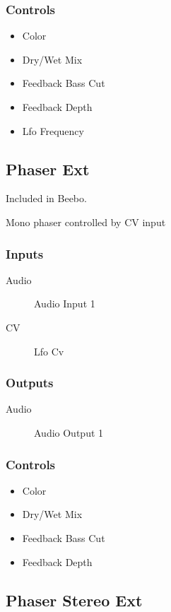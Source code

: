 \subsubsection{Controls}
\begin{itemize}
\item Color
\item Dry/Wet Mix
\item Feedback Bass Cut
\item Feedback Depth
\item Lfo Frequency
\end{itemize}

\subsection{Phaser Ext}

Included in Beebo.

Mono phaser controlled by CV input



\subsubsection{Inputs}
\begin{description}
\item [Audio] Audio Input 1
\item [CV] Lfo Cv
\end{description}

\subsubsection{Outputs}
\begin{description}
\item [Audio] Audio Output 1
\end{description}

\subsubsection{Controls}
\begin{itemize}
\item Color
\item Dry/Wet Mix
\item Feedback Bass Cut
\item Feedback Depth
\end{itemize}

\subsection{Phaser Stereo Ext}

